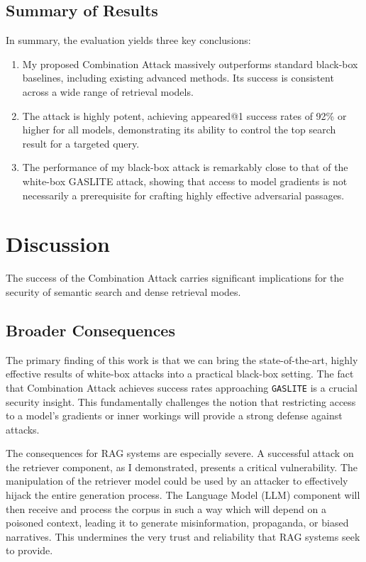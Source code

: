 \documentclass[a4paper, sigconf]{acmart}
\begin{document}
\subsection{Summary of Results}

In summary, the evaluation yields three key conclusions:
\begin{enumerate}
  \item My proposed Combination Attack massively outperforms standard black-box baselines, including existing advanced methods. Its success is consistent across a wide range of retrieval models.
  \item The attack is highly potent, achieving appeared@1 success rates of 92\% or higher for all models, demonstrating its ability to control the top search result for a targeted query.
  \item The performance of my black-box attack is remarkably close to that of the white-box GASLITE attack, showing that access to model gradients is not necessarily a prerequisite for crafting highly effective adversarial passages.
\end{enumerate}


\section{Discussion}

The success of the Combination Attack carries significant implications for the security of semantic search and dense retrieval modes.


\subsection{Broader Consequences}

The primary finding of this work is that we can bring the state-of-the-art, highly effective results of white-box attacks into a practical black-box setting. The fact that Combination Attack achieves success rates approaching \texttt{GASLITE} is a crucial security insight. This fundamentally challenges the notion that restricting access to a model's gradients or inner workings will provide a strong defense against attacks. 

The consequences for RAG systems are especially severe. A successful attack on the retriever component, as I demonstrated, presents a critical vulnerability. The manipulation of the retriever model could be used by an attacker to effectively hijack the entire generation process. The Language Model (LLM) component will then receive and process the corpus in such a way which will depend on a poisoned context, leading it to generate misinformation, propaganda, or biased narratives. This undermines the very trust and reliability that RAG systems seek to provide. 
\end{document}
